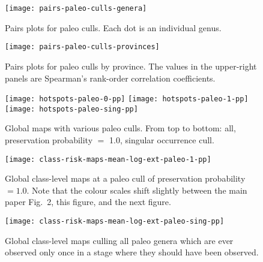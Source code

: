 \documentclass[11pt]{article}
\begin{document}
\begin{figure}[htbp]
\begin{center}
\texttt{[image: pairs-paleo-culls-genera]}
\caption{Pairs plots for paleo culls. Each dot is an individual genus.}
\label{fig:pairs-genus-paleo-culls}
\end{center}
\end{figure}

\clearpage

\begin{figure}[htbp]
\begin{center}
\texttt{[image: pairs-paleo-culls-provinces]}
\caption{Pairs plots for paleo culls by province. The values in the upper-right panels are Spearman's rank-order correlation coefficients.}
\label{fig:pairs-prov-paleo-culls}
\end{center}
\end{figure}

\clearpage

\begin{figure}[htbp]
\begin{center}
\texttt{[image: hotspots-paleo-0-pp]}
\texttt{[image: hotspots-paleo-1-pp]}
\texttt{[image: hotspots-paleo-sing-pp]}
\caption{Global maps with various paleo culls. From top to bottom: all, preservation probability $=$ 1.0, singular occurrence cull.}
\label{fig:overall-maps-paleo-culls}
\end{center}
\end{figure}

\begin{figure}[htbp]
\begin{center}
\texttt{[image: class-risk-maps-mean-log-ext-paleo-1-pp]}
\caption{Global class-level maps at a paleo cull of preservation probability $= 1.0$. Note that the colour scales shift slightly between the main paper Fig.\ 2, this figure, and the next figure.}
\label{fig:class-maps-paleo-cull-1-pp}
\end{center}
\end{figure}

\begin{figure}[htbp]
\begin{center}
\texttt{[image: class-risk-maps-mean-log-ext-paleo-sing-pp]}
\caption{Global class-level maps culling all paleo genera which are ever observed only once in a stage where they should have been observed.}
\label{fig:class-maps-paleo-sing-pp}
\end{center}
\end{figure}
\end{document}
